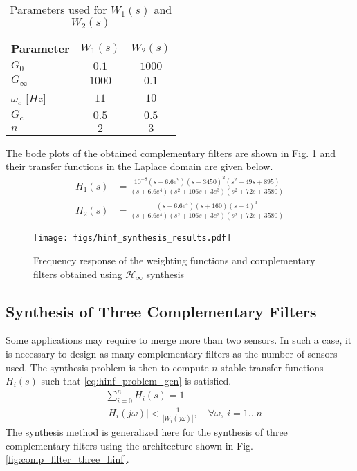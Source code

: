 \documentclass[letterpaper, 10 pt, conference]{ieeeconf}
\begin{document}
\begin{table}[htbp]
\caption{\label{tab:weights_params}
Parameters used for \(W_1(s)\) and \(W_2(s)\)}
\centering
\begin{tabularx}{0.5\linewidth}{Xcc}
\toprule
Parameter & \(W_1(s)\) & \(W_2(s)\)\\
\midrule
\(G_0\) & \(0.1\) & \(1000\)\\
\(G_\infty\) & \(1000\) & \(0.1\)\\
\(\omega_c\) [\(\si{Hz}\)] & \(11\) & \(10\)\\
\(G_c\) & \(0.5\) & \(0.5\)\\
\(n\) & \(2\) & \(3\)\\
\bottomrule
\end{tabularx}
\end{table}

The bode plots of the obtained complementary filters are shown in Fig. \ref{fig:hinf_synthesis_results} and their transfer functions in the Laplace domain are given below.
\begin{align*}
  H_1(s) &= \frac{10^{-8} (s+6.6e^9) (s+3450)^2 (s^2 + 49s + 895)}{(s+6.6e^4) (s^2 + 106 s + 3e^3) (s^2 + 72s + 3580)}\\
  H_2(s) &= \frac{(s+6.6e^4) (s+160) (s+4)^3}{(s+6.6e^4) (s^2 + 106 s + 3e^3) (s^2 + 72s + 3580)}
\end{align*}

\begin{figure}[htbp]
\centering
\texttt{[image: figs/hinf\_synthesis\_results.pdf]}
\caption{\label{fig:hinf_synthesis_results}
Frequency response of the weighting functions and complementary filters obtained using \(\mathcal{H}_\infty\) synthesis}
\end{figure}

\subsection{Synthesis of Three Complementary Filters}
\label{sec:orgdfc880e}
\label{sec:hinf_three_comp_filters}
Some applications may require to merge more than two sensors.
In such a case, it is necessary to design as many complementary filters as the number of sensors used.
The synthesis problem is then to compute \(n\) stable transfer functions \(H_i(s)\) such that \eqref{eq:hinf_problem_gen} is satisfied.
\begin{subequations}
\label{eq:hinf_problem_gen}
  \begin{align}
  & \sum_{i=0}^n H_i(s) = 1 \label{eq:hinf_cond_compl_gen} \\
  & \left| H_i(j\omega) \right| < \frac{1}{\left| W_i(j\omega) \right|}, \quad \forall \omega,\ i = 1 \dots n \label{eq:hinf_cond_perf_gen}
  \end{align}
\end{subequations}
The synthesis method is generalized here for the synthesis of three complementary filters using the architecture shown in Fig. \ref{fig:comp_filter_three_hinf}.
\end{document}
